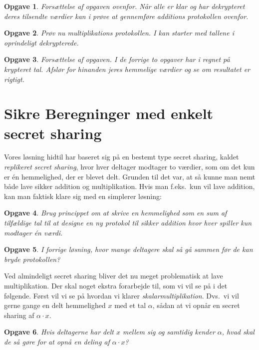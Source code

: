 \documentclass{article}
\theoremstyle{opgavedd}
\newtheorem{opgave}{Opgave}[section]
\begin{document}
\begin{opgave}
  Forsættelse af opgaven ovenfor. Når alle er klar og har dekrypteret deres tilsendte
  værdier kan i prøve at gennemføre additions protokollen ovenfor.
\end{opgave}

\begin{opgave}
  Prøv nu multiplikations protokollen. I kan starter med tallene i oprindeligt
  dekrypterede.
\end{opgave}

\begin{opgave}
  Forsættelse af opgaven. I de forrige to opgaver har i regnet på krypteret tal. Afslør
  for hinanden jeres hemmelige værdier og se om resultatet er rigtigt.
\end{opgave}

\section{Sikre Beregninger med enkelt secret sharing}
Vores løsning hidtil har baseret sig på en bestemt type secret sharing, kaldet
\emph{replikeret secret sharing}, hvor hver deltager modtager to værdier, som om det kun
er én hemmelighed, der er blevet delt. Grunden til det var, at så kunne man nemt både lave
sikker addition og multiplikation. Hvis man f.eks.~kun vil lave addition, kan man faktisk
klare sig med en simplerer løsning:

\begin{opgave}
  Brug princippet om at skrive en hemmelighed som en sum af tilfældige tal til at designe
  en ny protokol til sikker addition hvor hver spiller kun modtager én værdi.
\end{opgave}

\begin{opgave}
  I forrige løsning, hvor mange deltagere skal så gå sammen før de kan bryde protokollen?
\end{opgave}

Ved almindeligt secret sharing bliver det nu meget problematisk at lave
multiplikation. Der skal noget ekstra forarbejde til, som vi vil se på i det
følgende. Først vil vi se på hvordan vi klarer \emph{skalarmultiplikation}. Dvs.~vi vil
gerne gange en delt hemmelighed $x$ med et tal $\alpha$, sådan at vi opnår en secret
sharing af $\alpha\cdot x$.

\begin{opgave}
  Hvis deltagerne har delt $x$ mellem sig og samtidig kender $\alpha$, hvad skal de så
  gøre for at opnå en deling af $\alpha\cdot x$?
\end{opgave}
\end{document}
